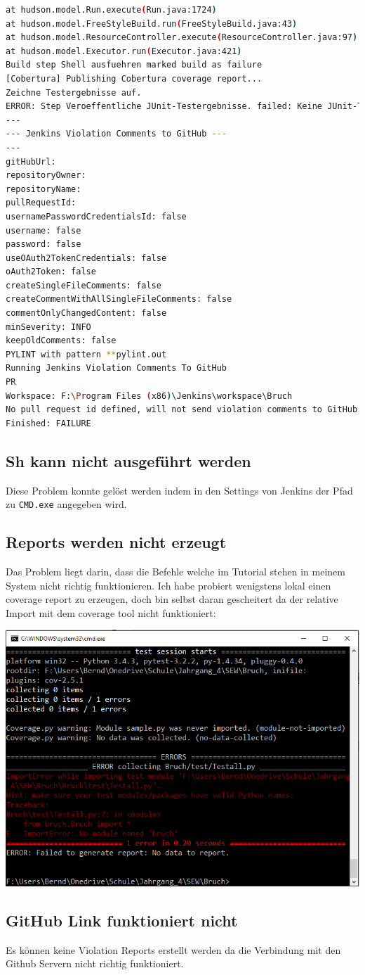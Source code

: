 \begin{lstlisting}[language=bash]
at hudson.model.Run.execute(Run.java:1724)
at hudson.model.FreeStyleBuild.run(FreeStyleBuild.java:43)
at hudson.model.ResourceController.execute(ResourceController.java:97)
at hudson.model.Executor.run(Executor.java:421)
Build step Shell ausfuehren marked build as failure
[Cobertura] Publishing Cobertura coverage report...
Zeichne Testergebnisse auf.
ERROR: Step Veroeffentliche JUnit-Testergebnisse. failed: Keine JUnit-Testergebnisse gefunden. Liegt vielleicht ein Konfigurationsfehler vor?
---
--- Jenkins Violation Comments to GitHub ---
---
gitHubUrl: 
repositoryOwner: 
repositoryName: 
pullRequestId: 
usernamePasswordCredentialsId: false
username: false
password: false
useOAuth2TokenCredentials: false
oAuth2Token: false
createSingleFileComments: false
createCommentWithAllSingleFileComments: false
commentOnlyChangedContent: false
minSeverity: INFO
keepOldComments: false
PYLINT with pattern **pylint.out
Running Jenkins Violation Comments To GitHub
PR 
Workspace: F:\Program Files (x86)\Jenkins\workspace\Bruch
No pull request id defined, will not send violation comments to GitHub.
Finished: FAILURE
\end{lstlisting}

\subsection{Sh kann nicht ausgeführt werden}
Diese Problem konnte gelöst werden indem in den Settings von Jenkins der Pfad zu \verb|CMD.exe| angegeben wird.

\subsection{Reports werden nicht erzeugt}
Das Problem liegt darin, dass die Befehle welche im Tutorial stehen in meinem System nicht richtig funktionieren. Ich habe probiert wenigstens lokal einen coverage report zu erzeugen, doch bin selbst daran gescheitert da der relative Import mit dem coverage tool nicht funktioniert:


\begin{minipage}{\linewidth}
	\centering
	\includegraphics[width=0.8\linewidth]{images/error_python}
\end{minipage}

\subsection{GitHub Link funktioniert nicht}
Es können keine Violation Reports erstellt werden da die Verbindung mit den Github Servern nicht richtig funktioniert.